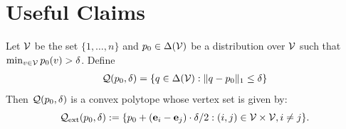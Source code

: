 
\section{Useful Claims}

\begin{lemma}\label{lem:q_concave_vertices}
Let $\mathcal{V}$ be the set $\{1,\dots,n\}$ and $p_0 \in \Delta(\mathcal{V})$ be a distribution over $\mathcal{V}$ such that $\min_{v \in \mathcal{V}}p_0(v) > \delta$. 
Define
\begin{align*}
    \mathcal{Q}(p_0,\delta) = \left\{q \in \Delta(\mathcal{V}): \|q - p_0\|_1 \leq \delta\right\} 
\end{align*}
Then $\mathcal{Q}(p_0,\delta)$ is a convex polytope whose vertex set is given by:
$$\mathcal{Q}_{\mathrm{ext}}(p_0,\delta) := \{p_0 + (\mathbf{e}_i-\mathbf{e}_j)\cdot \delta/2: (i,j) \in \mathcal{V}\times \mathcal{V}, i\neq j\}.$$
\end{lemma}

